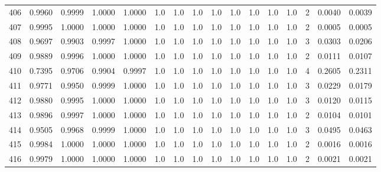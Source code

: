 \begin{tabular}{lrrrrrrrrrrrrrrr}
406 &      0.9960 &  0.9999 &  1.0000 &  1.0000 &     1.0 &     1.0 &     1.0 &     1.0 &     1.0 &     1.0 &      1.0 &        1.0 &      2 &                    0.0040 &                     0.0039 \\
407 &      0.9995 &  1.0000 &  1.0000 &  1.0000 &     1.0 &     1.0 &     1.0 &     1.0 &     1.0 &     1.0 &      1.0 &        1.0 &      2 &                    0.0005 &                     0.0005 \\
408 &      0.9697 &  0.9903 &  0.9997 &  1.0000 &     1.0 &     1.0 &     1.0 &     1.0 &     1.0 &     1.0 &      1.0 &        1.0 &      3 &                    0.0303 &                     0.0206 \\
409 &      0.9889 &  0.9996 &  1.0000 &  1.0000 &     1.0 &     1.0 &     1.0 &     1.0 &     1.0 &     1.0 &      1.0 &        1.0 &      2 &                    0.0111 &                     0.0107 \\
410 &      0.7395 &  0.9706 &  0.9904 &  0.9997 &     1.0 &     1.0 &     1.0 &     1.0 &     1.0 &     1.0 &      1.0 &        1.0 &      4 &                    0.2605 &                     0.2311 \\
411 &      0.9771 &  0.9950 &  0.9999 &  1.0000 &     1.0 &     1.0 &     1.0 &     1.0 &     1.0 &     1.0 &      1.0 &        1.0 &      3 &                    0.0229 &                     0.0179 \\
412 &      0.9880 &  0.9995 &  1.0000 &  1.0000 &     1.0 &     1.0 &     1.0 &     1.0 &     1.0 &     1.0 &      1.0 &        1.0 &      3 &                    0.0120 &                     0.0115 \\
413 &      0.9896 &  0.9997 &  1.0000 &  1.0000 &     1.0 &     1.0 &     1.0 &     1.0 &     1.0 &     1.0 &      1.0 &        1.0 &      2 &                    0.0104 &                     0.0101 \\
414 &      0.9505 &  0.9968 &  0.9999 &  1.0000 &     1.0 &     1.0 &     1.0 &     1.0 &     1.0 &     1.0 &      1.0 &        1.0 &      3 &                    0.0495 &                     0.0463 \\
415 &      0.9984 &  1.0000 &  1.0000 &  1.0000 &     1.0 &     1.0 &     1.0 &     1.0 &     1.0 &     1.0 &      1.0 &        1.0 &      2 &                    0.0016 &                     0.0016 \\
416 &      0.9979 &  1.0000 &  1.0000 &  1.0000 &     1.0 &     1.0 &     1.0 &     1.0 &     1.0 &     1.0 &      1.0 &        1.0 &      2 &                    0.0021 &                     0.0021 \\

\end{tabular}
